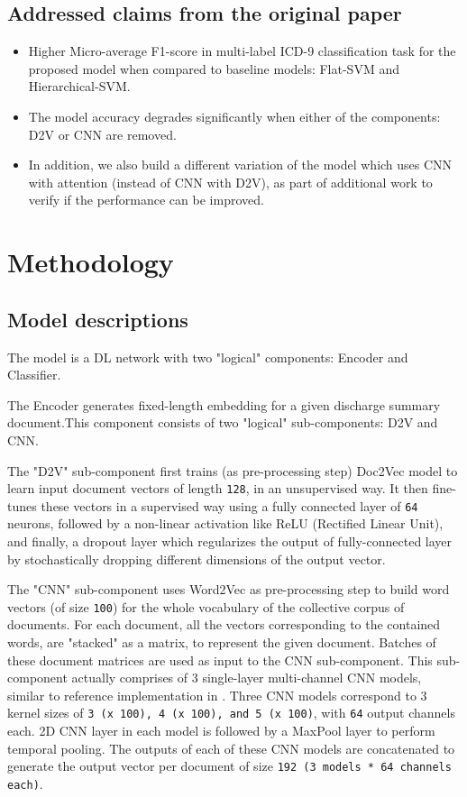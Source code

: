 \documentclass[11pt,a4paper]{article}
\begin{document}
\subsection{Addressed claims from the original paper}


\begin{itemize}
    \item Higher Micro-average F1-score in multi-label ICD-9 classification task for the proposed model when compared to baseline models: Flat-SVM and Hierarchical-SVM.
    \item The model accuracy degrades significantly when either of the components: D2V or CNN are removed.
    \item In addition, we also build a different variation of the model which uses CNN with attention (instead of CNN with D2V), as part of additional work to verify if the performance can be improved.
\end{itemize}

\section{Methodology}

\subsection{Model descriptions}
The model is a DL network with two "logical" components: Encoder and Classifier.

The Encoder generates fixed-length embedding for a given discharge summary document.This component consists of two "logical" sub-components: D2V and CNN.

The "D2V" sub-component first trains (as pre-processing step) Doc2Vec model to learn input document vectors of length \texttt{128}, in an unsupervised way. It then fine-tunes these vectors in a supervised way using a fully connected layer of \texttt{64} neurons, followed by a non-linear activation like ReLU (Rectified Linear Unit), and finally, a dropout layer which regularizes the output of fully-connected layer by stochastically dropping different dimensions of the output vector.

The "CNN" sub-component uses Word2Vec as pre-processing step to build word vectors (of size \texttt{100}) for the whole vocabulary of the collective corpus of documents. For each document, all the vectors corresponding to the contained words, are "stacked" as a matrix, to represent the given document. Batches of these document matrices are used as input to the CNN sub-component. This sub-component actually comprises of 3 single-layer multi-channel CNN models, similar to reference implementation in \cite{kim2014convolutional}. Three CNN models correspond to 3 kernel sizes of \texttt{3 (x 100), 4 (x 100), and 5 (x 100)}, with \texttt{64} output channels each. 2D CNN layer in each model is followed by a MaxPool layer to perform temporal pooling. The outputs of each of these CNN models are concatenated to generate the output vector per document of size \texttt{192 (3 models * 64 channels each)}.
    
\end{document}
